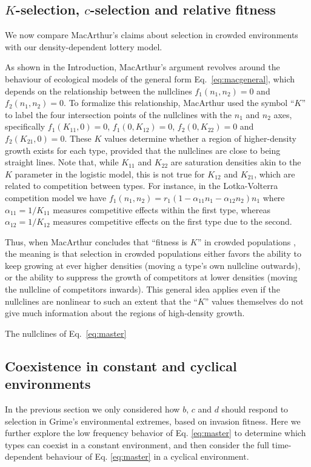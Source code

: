 \documentclass[11pt]{article}
\begin{document}
\subsection*{$K$-selection, $c$-selection and relative fitness}

We now compare MacArthur's claims about selection in crowded environments with our density-dependent lottery model.

As shown in the Introduction, MacArthur's argument revolves around the behaviour of  ecological models of the general form Eq.~\ref{eq:macgeneral}, which depends on the relationship between the nullclines $f_1(n_1,n_2)=0$ and $f_2(n_1,n_2)=0$. To formalize this relationship, MacArthur used the symbol ``$K$'' to label the four intersection points of the nullclines with the $n_1$ and $n_2$ axes, specifically $f_1(K_{11},0)=0$, $f_1(0,K_{12})=0$, $f_2(0,K_{22})=0$ and $f_2(K_{21},0)=0$. These $K$ values determine whether a region of higher-density growth exists for each type, provided that the nullclines are close to being straight lines. Note that, while $K_{11}$ and $K_{22}$ are saturation densities akin to the $K$ parameter in the logistic model, this is not true for $K_{12}$ and $K_{21}$, which are related to competition between types. For instance, in the Lotka-Volterra competition model we have $f_1(n_1,n_2)=r_1(1-\alpha_{11}n_1-\alpha_{12}n_2)n_1$ where $\alpha_{11}=1/K_{11}$ measures competitive effects within the first type, whereas $\alpha_{12}=1/K_{12}$ measures competitive effects on the first type due to the second.  

Thus, when MacArthur concludes that  ``fitness is $K$'' in crowded populations \citep[pp. 149]{macarthur_1967}, the meaning is that selection in crowded populations either favors the ability to keep growing at ever higher densities (moving a type's own nullcline outwards), or the ability to suppress the growth of competitors at lower densities (moving the nullcline of competitors inwards). This general idea applies even if the nullclines are nonlinear to such an extent that the ``$K$'' values themselves do not give much information about the regions of high-density growth.

The nullclines of Eq.~\eqref{eq:master} 


\subsection*{Coexistence in constant and cyclical environments}\label{sec:invas}

In the previous section we only considered how $b$, $c$ and $d$ should respond to selection in Grime's environmental extremes, based on invasion fitness. Here we further explore the low frequency behavior of Eq. \eqref{eq:master} to determine which types can coexist in a constant environment, and then consider the full time-dependent behaviour of Eq. \eqref{eq:master} in a cyclical environment. 
\end{document}

